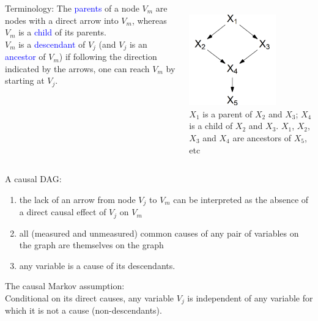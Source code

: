 \documentclass[10pt,dvipsnames,t,handout%
,aspectratio=169%
]{beamer}%
\begin{document}
\begin{frame}
	\begin{columns}
	\begin{column}{6cm}
	\begin{block}{Terminology:}
The \textcolor{blue}{parents} of a node $V_m$ are nodes with a direct arrow into $V_m$, whereas $V_m$ is a \textcolor{blue}{child} of its parents.  \\[0.5cm]
$V_m$ is a \textcolor{blue}{descendant} of $V_j$ (and $V_j$ is an \textcolor{blue}{ancestor} of $V_m$) if 
following the direction indicated by the arrows, one can reach $V_m$ by starting at $V_j$.
	\end{block}
	\end{column}
	\begin{column}{6cm}
		\mbox{}\\
{\includegraphics[width=0.7\textwidth]{pearlexample}} \\[3mm]
$X_1$ is a parent of $X_2$ and $X_3$; $X_4$ is a child of $X_2$ and $X_3$. $X_1$, $X_2$, $X_3$ and $X_4$ are ancestors of $X_5$, etc 
	\end{column}
\end{columns}
\end{frame}


\begin{frame}
	
	A causal DAG: \begin{enumerate}
		\item  the lack of an arrow from node $V_j$ to $V_m$ can be interpreted as the absence
		of a direct causal effect of $V_j$ on $V_m$  
		\item  all (measured and unmeasured) common causes of any pair of variables on the graph are themselves on the graph 
		\item any variable is a cause of its descendants.
	\end{enumerate}
	\alert{The causal Markov assumption:} \\
	Conditional on its direct causes, any variable $V_j$ is independent of any variable for which it is not a cause (non-descendants). 
\end{frame}
\end{document}

